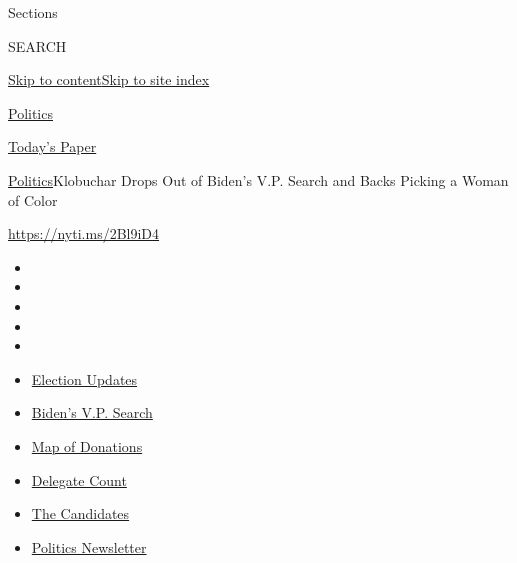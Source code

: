 Sections

SEARCH

\protect\hyperlink{site-content}{Skip to
content}\protect\hyperlink{site-index}{Skip to site index}

\href{https://www.nytimes3xbfgragh.onion/section/politics}{Politics}

\href{https://myaccount.nytimes3xbfgragh.onion/auth/login?response_type=cookie\&client_id=vi}{}

\href{https://www.nytimes3xbfgragh.onion/section/todayspaper}{Today's
Paper}

\href{/section/politics}{Politics}\textbar{}Klobuchar Drops Out of
Biden's V.P. Search and Backs Picking a Woman of Color

\url{https://nyti.ms/2Bl9iD4}

\begin{itemize}
\item
\item
\item
\item
\item
\end{itemize}

\begin{itemize}
\item
  \href{https://www.nytimes3xbfgragh.onion/2020/08/03/us/elections/biden-vs-trump.html?action=click\&pgtype=Article\&state=default\&region=TOP_BANNER\&context=storylines_menu}{Election
  Updates}
\item
  \href{https://www.nytimes3xbfgragh.onion/article/biden-vice-president-2020.html?action=click\&pgtype=Article\&state=default\&region=TOP_BANNER\&context=storylines_menu}{Biden's
  V.P. Search}
\item
  \href{https://www.nytimes3xbfgragh.onion/interactive/2020/07/24/us/politics/trump-biden-campaign-donors.html?action=click\&pgtype=Article\&state=default\&region=TOP_BANNER\&context=storylines_menu}{Map
  of Donations}
\item
  \href{https://www.nytimes3xbfgragh.onion/interactive/2020/us/elections/delegate-count-primary-results.html?action=click\&pgtype=Article\&state=default\&region=TOP_BANNER\&context=storylines_menu}{Delegate
  Count}
\item
  \href{https://www.nytimes3xbfgragh.onion/interactive/2019/us/politics/2020-presidential-candidates.html?action=click\&pgtype=Article\&state=default\&region=TOP_BANNER\&context=storylines_menu}{The
  Candidates}
\item
  \href{https://www.nytimes3xbfgragh.onion/newsletters/politics?action=click\&pgtype=Article\&state=default\&region=TOP_BANNER\&context=storylines_menu}{Politics
  Newsletter}
\end{itemize}

